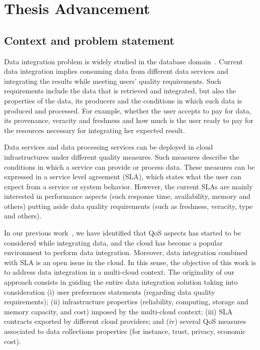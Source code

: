 \chapter{Thesis Advancement}
\label{chap:context}
\minitoc

\section{Context and problem statement}
Data integration problem is widely studied in the database domain~\cite{Lenzerini:2002}. 
Current data integration implies consuming data from different data services and integrating the results while meeting users' quality requirements. Such requirements include the data that is retrieved and integrated, but also the properties of the data, its producers and the conditions in which such data is produced and processed. For example, whether the user accepts to pay for data, its provenance, veracity and freshness and how much is the user ready to pay for the resources necessary for integrating her expected result. 

Data services and data processing services can be deployed in cloud infrastructures under different quality measures. Such measures describe the conditions in which a service can provide or process data. These measures can be expressed in a service level agreement (SLA), which states what the user can expect from a service or system behavior.
However, the current SLAs are mainly interested in performance aspects (such response time, availability, memory and others) putting aside data quality requirements (such as freshness, veracity, type and others).

In our previous work~\cite{Carvalho2015}, we have identified that QoS aspects has started to be considered while integrating data, and the cloud has become a popular environment to perform data integration. Moreover, data integration combined with SLA is an open issue in the cloud. 
In this sense, the objective of this work is to address data integration in a multi-cloud context. 
The originality of our approach consists in guiding the entire data integration solution taking into consideration
(i) user preferences statements (regarding data quality requirements); 
(ii) infrastructure properties (reliability, computing, storage and memory capacity, and cost) imposed by the multi-cloud context; 
(iii) SLA contracts exported by different cloud providers; and 
(iv) several QoS measures associated to data collections properties (for instance, trust, privacy, economic cost).

